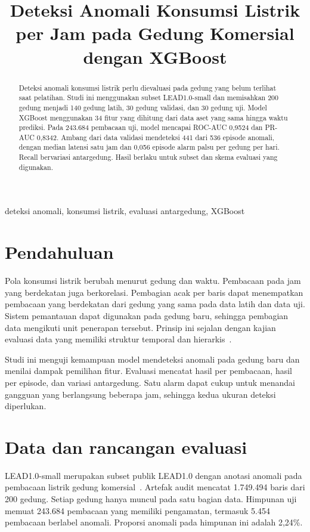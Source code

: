 \documentclass[conference]{IEEEtran}
\begin{document}
\title{Deteksi Anomali Konsumsi Listrik per Jam pada Gedung Komersial dengan XGBoost}
\author{}
\maketitle
\begin{abstract}
Deteksi anomali konsumsi listrik perlu dievaluasi pada gedung yang belum terlihat saat pelatihan. Studi ini menggunakan subset LEAD1.0-small dan memisahkan 200 gedung menjadi 140 gedung latih, 30 gedung validasi, dan 30 gedung uji. Model XGBoost menggunakan 34 fitur yang dihitung dari data aset yang sama hingga waktu prediksi. Pada 243.684 pembacaan uji, model mencapai ROC-AUC 0,9524 dan PR-AUC 0,8342. Ambang dari data validasi mendeteksi 441 dari 536 episode anomali, dengan median latensi satu jam dan 0,056 episode alarm palsu per gedung per hari. Recall bervariasi antargedung. Hasil berlaku untuk subset dan skema evaluasi yang digunakan.
\end{abstract}
\begin{IEEEkeywords}
deteksi anomali, konsumsi listrik, evaluasi antargedung, XGBoost
\end{IEEEkeywords}

\section{Pendahuluan}
Pola konsumsi listrik berubah menurut gedung dan waktu. Pembacaan pada jam yang berdekatan juga berkorelasi. Pembagian acak per baris dapat menempatkan pembacaan yang berdekatan dari gedung yang sama pada data latih dan data uji. Sistem pemantauan dapat digunakan pada gedung baru, sehingga pembagian data mengikuti unit penerapan tersebut. Prinsip ini sejalan dengan kajian evaluasi data yang memiliki struktur temporal dan hierarkis~\cite{roberts}.

Studi ini menguji kemampuan model mendeteksi anomali pada gedung baru dan menilai dampak pemilihan fitur. Evaluasi mencatat hasil per pembacaan, hasil per episode, dan variasi antargedung. Satu alarm dapat cukup untuk menandai gangguan yang berlangsung beberapa jam, sehingga kedua ukuran deteksi diperlukan.

\section{Data dan rancangan evaluasi}
LEAD1.0-small merupakan subset publik LEAD1.0 dengan anotasi anomali pada pembacaan listrik gedung komersial~\cite{lead}. Artefak audit mencatat 1.749.494 baris dari 200 gedung. Setiap gedung hanya muncul pada satu bagian data. Himpunan uji memuat 243.684 pembacaan yang memiliki pengamatan, termasuk 5.454 pembacaan berlabel anomali. Proporsi anomali pada himpunan ini adalah 2,24\%.
\end{document}

